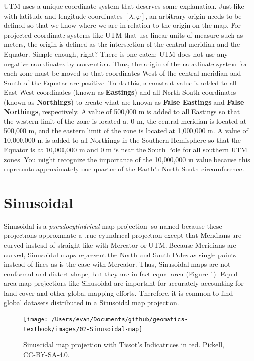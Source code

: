 \documentclass[
]{book}
\begin{document}
UTM uses a unique coordinate system that deserves some explanation. Just like with latitude and longitude coordinates \([λ,φ]\), an arbitrary origin needs to be defined so that we know where we are in relation to the origin on the map. For projected coordinate systems like UTM that use linear units of measure such as meters, the origin is defined as the intersection of the central meridian and the Equator. Simple enough, right? There is one catch: UTM does not use any negative coordinates by convention. Thus, the origin of the coordinate system for each zone must be moved so that coordinates West of the central meridian and South of the Equator are positive. To do this, a constant value is added to all East-West coordinates (known as \textbf{Eastings}) and all North-South coordinates (known as \textbf{Northings}) to create what are known as \textbf{False Eastings} and \textbf{False Northings}, respectively. A value of 500,000 m is added to all Eastings so that the western limit of the zone is located at 0 m, the central meridian is located at 500,000 m, and the eastern limit of the zone is located at 1,000,000 m. A value of 10,000,000 m is added to all Northings in the Southern Hemisphere so that the Equator is at 10,000,000 m and 0 m is near the South Pole for all southern UTM zones. You might recognize the importance of the 10,000,000 m value because this represents approximately one-quarter of the Earth's North-South circumference.

\hypertarget{sinusoidal}{%
\section{Sinusoidal}\label{sinusoidal}}

Sinusoidal is a \emph{pseudocylindrical} map projection, so-named because these projections approximate a true cylindrical projection except that Meridians are curved instead of straight like with Mercator or UTM. Because Meridians are curved, Sinusoidal maps represent the North and South Poles as single points instead of lines as is the case with Mercator. Thus, Sinusoidal maps are not conformal and distort shape, but they are in fact equal-area (Figure \ref{fig:2-Sinusoidal-map}). Equal-area map projections like Sinusoidal are important for accurately accounting for land cover and other global mapping efforts. Therefore, it is common to find global datasets distributed in a Sinusoidal map projection.

\begin{figure}
\texttt{[image: /Users/evan/Documents/github/geomatics-textbook/images/02-Sinusoidal-map]} \caption{Sinusoidal map projection with Tissot's Indicatrices in red. Pickell, CC-BY-SA-4.0.}\label{fig:2-Sinusoidal-map}
\end{figure}
\end{document}
